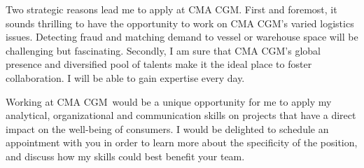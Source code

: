 \documentclass[11pt, a4paper]{awesome-cv}
\newcommand{\company}{CMA CGM}
\begin{document}
\begin{cvletter}
Two strategic reasons lead me to apply at \company.    
First and foremost, it sounds thrilling to have the opportunity to work on \company's varied logistics issues. 
Detecting fraud and matching demand to vessel or warehouse space will be challenging but fascinating. 
Secondly, I am sure that \company's global presence and diversified pool of talents make it the ideal place to foster collaboration. I will be able to gain expertise every day. 

Working at \company~would be a unique opportunity for me to apply my analytical, organizational and communication skills on projects that have a direct impact on the well-being of consumers.  
I would be delighted to schedule an appointment with you in order to learn more about the specificity of the position, and discuss how my skills could best benefit your team. 
\end{cvletter}


\makeletterclosing
\end{document}
